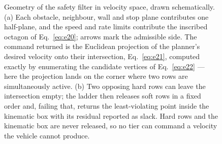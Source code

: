 \documentclass[10pt,letterpaper]{article}
\begin{document}
\begin{figure}[tbp]
    \caption{Geometry of the safety filter in velocity space, drawn schematically. (a) Each
        obstacle, neighbour, wall and stop plane contributes one half-plane, and the speed
        and rate limits contribute the inscribed octagon of Eq.~\eqref{eq:e20}; arrows mark
        the admissible side. The command returned is the Euclidean projection of the
        planner's desired velocity onto their intersection, Eq.~\eqref{eq:e21}, computed
        exactly by enumerating the candidate vertices of Eq.~\eqref{eq:e22} --- here the
        projection lands on the corner where two rows are simultaneously active. (b) Two
        opposing hard rows can leave the intersection empty; the ladder then releases soft
        rows in a fixed order and, failing that, returns the least-violating point inside the
        kinematic box with its residual reported as slack. Hard rows and the kinematic box are
        never released, so no tier can command a velocity the vehicle cannot produce.}
    \label{fig:qp}
\end{figure}
\end{document}
